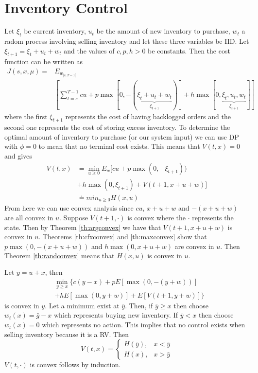 \section{Inventory Control}
Let $\xi_t$ be current inventory, $u_t$ be the amount of new inventory to purchase, $w_t$ a radom process involving selling inventory and let these three variables be IID. Let $\xi_{t+1} = \xi_t+u_t+w_t$ and the values of $c,p,h>0$ be constants. Then the cost function can be written as
\begin{align*}
J(s,x,\mu) =& E_{w_{]s,T-1[}} \\
&\left[\sum_{t=s}^{T-1}cu+p\max[0,-(\underbrace{\xi_t+u_t+w_t}_{\xi_{t+1}})] + h\max[0,\underbrace{\xi_t,u_t,w_t}_{\xi_{t+1}}] \right]
\end{align*}
where the first $\xi_{t+1}$ represents the cost of having backlogged orders and the second one represents the cost of storing excess inventory. To determine the optimal amount of inventory to purchase (or our system input) we can use DP with $\phi=0$ to mean that no terminal cost exists. This means that $V(t,x)=0$ and gives
\begin{align*}
V(t,x) &= \min_{u\geq 0}E_w[cu+p\max(0,-\xi_{t+1})) \\
&+ h\max(0,\xi_{t+1}) + V(t+1,x+u+w)] \\
&\doteq min_{u\geq 0}H(x,u)
\end{align*}
From here we can use convex analysis since $cu$, $x+u+w$ and $-(x+u+w)$ are all convex in $u$. Suppose $V(t+1,\cdot)$ is convex where the $\cdot$ represents the state. Then by Theorem \ref{th:argconvex} we have that $V(t+1,x+u+w)$ is convex in $u$. Theorems \ref{th:cfxconvex} and \ref{th:maxconvex} show that $p\max(0,-(x+u+w))$ and $h\max(0,x+u+w)$ are convex in $u$. Then Theorem \ref{th:randconvex} means that $H(x,u)$ is convex in $u$.

Let $y=u+x$, then
\begin{align*}
&\min_{y\geq x}\{ c(y-x)+pE[\max(0,-(y+w))] \\
&+ hE[\max(0,y+w)] + E[V(t+1,y+w)]\}
\end{align*}
is convex in $y$. Let a minimum exist at $\bar{y}$. Then, if $\bar{y}\geq x$ then choose $w_t(x) = \bar{g}-x$ which represents buying new inventory. If $\bar{y}<x$ then choose $w_t(x)=0$ which represents no action. This implies that no control exists when selling inventory because it is a RV. Then
$$V(t,x) = \begin{cases} H(\bar{y}), & x<\bar{y} \\ H(x), & x>\bar{y} \end{cases}$$
$V(t,\cdot)$ is convex follows by induction.

